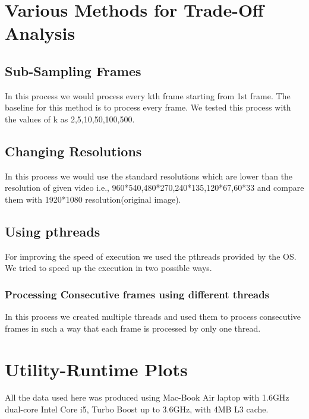 \documentclass[12pt]{article}
\begin{document}
 \section{Various Methods for Trade-Off Analysis}
 \subsection{Sub-Sampling Frames}
 In this process we would process every kth frame starting from 1st frame.
 The baseline for this method is to process every frame.
 We tested this process with the values of k as 2,5,10,50,100,500.
 
 \subsection{Changing Resolutions}
 In this process we would use the standard resolutions which are lower than the resolution of given video i.e., 960*540,480*270,240*135,120*67,60*33 and compare them with 1920*1080 resolution(original image).
 
 \newpage
 
 \subsection{Using pthreads}
  For improving the speed of execution we used the pthreads provided by the OS.
  We tried to speed up the execution in two possible ways.
  
 \subsubsection{Processing Consecutive frames using different threads }
 In this process we created multiple threads and used them to process consecutive frames in such a way that each frame is processed by only one thread.
 


\section{Utility-Runtime Plots}
All the data used here was produced using Mac-Book Air laptop with 1.6GHz dual-core Intel Core i5, Turbo Boost up to 3.6GHz, with 4MB L3 cache.
\end{document}
